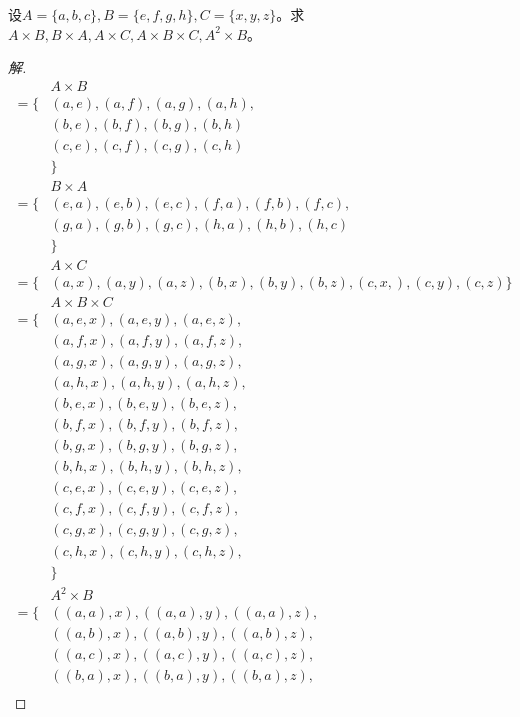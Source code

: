 \documentclass{article}
\begin{document}
\begin{CJK}{UTF8}{gbsn}
\begin{Exercise}
  设$A=\{a,b,c\}, B=\{e,f,g,h\}, C=\{x,y,z\}$。求$A\times B, B\times A, A\times C, A\times B \times C, A^2\times B$。
\end{Exercise}
\begin{proof}[解]
  \begin{align*}
    &A\times B\\
    =\{&(a,e),(a,f),(a,g),(a,h),\\
    &(b,e),(b,f),(b,g),(b,h)\\
    &(c,e),(c,f),(c,g),(c,h)\\
      &\}\\ 
      &B\times A\\
      =\{&(e,a),(e,b),(e,c),
      (f,a),(f,b),(f,c),\\
      &(g,a),(g,b),(g,c),
      (h,a),(h,b),(h,c)\\
        &\}\\   
        &A\times C\\
        =\{&(a,x),(a,y),(a,z),
        (b,x),(b,y),(b,z),  
      (c,x,),(c,y),(c,z) 
        \}\\ 
        &A\times B\times C\\ 
        =\{ & (a,e,x),(a,e,y),(a,e,z),\\ 
        &(a,f,x),(a,f,y),(a,f,z),\\ 
        &(a,g,x),(a,g,y),(a,g,z),\\ 
        &(a,h,x),(a,h,y),(a,h,z),\\ 
        & (b,e,x),(b,e,y),(b,e,z),\\ 
        &(b,f,x),(b,f,y),(b,f,z),\\ 
        &(b,g,x),(b,g,y),(b,g,z),\\ 
        &(b,h,x),(b,h,y),(b,h,z),\\ 
        & (c,e,x),(c,e,y),(c,e,z),\\ 
        &(c,f,x),(c,f,y),(c,f,z),\\ 
        &(c,g,x),(c,g,y),(c,g,z),\\ 
        &(c,h,x),(c,h,y),(c,h,z),\\ 
        &\}\\
        &A^2\times B\\ 
        =\{ & ((a,a),x), ((a,a), y), ((a,a),z),\\ 
        &((a,b),x), ((a,b), y), ((a,b), z), \\ 
        &((a,c), x), ((a,c), y), ((a, c), z), \\ 
        & ((b,a),x), ((b,a), y), ((b,a),z),\\ 

\end{align*}
\end{proof}
\end{CJK}
\end{document}
